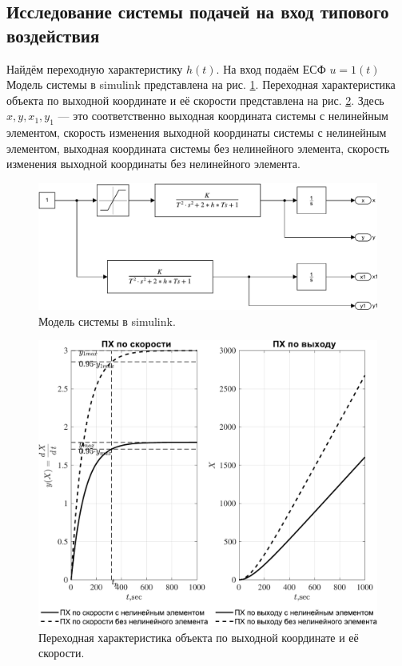 \subsection{Исследование системы подачей на вход типового воздействия}
Найдём переходную характеристику $h(t)$.
На вход подаём ЕСФ $u=1(t)$
Модель системы в simulink представлена на рис. \ref{fig:sim_object_analysis}.
Переходная характеристика объекта по выходной координате и её скорости представлена на рис. \ref{fig:object_analysis}.
Здесь $x,y,x_1,y_1$ --- это соответственно выходная координата системы с нелинейным элементом, скорость изменения выходной координаты системы с нелинейным элементом, выходная координата системы без нелинейного элемента, скорость изменения выходной координаты без нелинейного элемента.
\begin{figure}[!h]\centering
\includegraphics[width=\linewidth]{images/sim_object_analysis}
\caption{Модель системы в simulink.}\label{fig:sim_object_analysis}
\end{figure}
\begin{figure}[!h]\centering
\includegraphics[width=\linewidth]{images/object_analysis}
\caption{Переходная характеристика объекта по выходной координате и её скорости.}\label{fig:object_analysis}
\end{figure}

